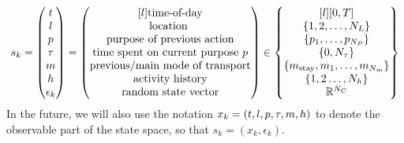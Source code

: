 \begin{equation}
    \s{k} = \begin{pmatrix}
    t \\
    l \\
    p \\
    \atime\\
    m \\
    \amem \\
    \epsilon_k
    \end{pmatrix} =
    \begin{pmatrix*}[l]
    \text{time-of-day} \\
    \text{location } \\
    \text{purpose of previous action} \\
    \text{time spent on current purpose $p$} \\
    \text{previous/main mode of transport} \\
    \text{activity history} \\
    \text{random state vector}
    \end{pmatrix*}
    \in
    \begin{Bmatrix*}[l]
    [0,T] \\
    \{1,2,\dots, N_L\} \\
    \{p_1,\dots,p_{N_P}\} \\
    \{0,N_{\atime}\} \\
    \{m_{\text{stay}},m_1,\dots,m_{N_m}\} \\
    \{1,2\dots,{N_\amem} \}\\
    \rr^{N_C}
    \end{Bmatrix*}
\end{equation}
In the future, we will also use the notation $x_k=(t,l,p,\tau,m,h)$ to denote the observable part of the state space, so that $s_k=(x_k,\epsilon_k)$.
